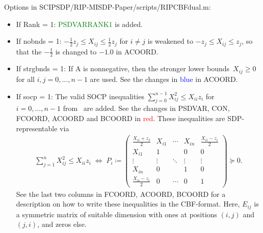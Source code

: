 \documentclass[11pt,a4paper]{article}
\newcommand{\define}{\coloneqq}
\theoremstyle{definition}
\begin{document}
Options in \textsf{SCIPSDP/RIP-MISDP-Paper/scripts/RIPCBFdual.m}:
\begin{itemize}
\item If Rank = 1: \textcolor{green}{PSDVARRANK1} is added.
\item If nobnds = 1: {\color{orange}
    $-\tfrac{1}{2}z_j \leq X_{ij} \leq \tfrac{1}{2}z_j$ for $i \neq j$} is
  weakened to {\color{orange}$-z_j \leq X_{ij} \leq z_j$}, so that the
  {\color{orange} $-\tfrac{1}{2}$} is changed to $-1.0$ in ACOORD.
\item If strgbnds = 1: If A is nonnegative, then the stronger lower
  bounds~$X_{ij} \geq 0$ for all $i,j =0,\dots,n-1$ are used. See the
  changes in \textcolor{blue}{blue} in ACOORD.
\item If socp = 1: The valid SOCP inequalities
  $\sum_{j=0}^{n-1}X_{ij}^2 \leq X_{ii}z_i$ for $i = 0,\dots,n-1$
  from~\cite{LiX20} are added. See the changes in PSDVAR, CON, FCOORD,
  ACOORD and BCOORD in \textcolor{red}{red}. These inequalities are
  SDP-representable via
  \begin{align*}
    \sum_{j=1}^n X_{ij}^2 \leq X_{ii}z_i \; \Leftrightarrow \;
    P_i \define \begin{pmatrix}
      \tfrac{X_{ii}+z_I}{2} & X_{i1} & \cdots & X_{in} & \tfrac{X_{ii}-z_i}{2}
      \\
      X_{i1} & 1 & & 0 & 0 \\
      \vdots &\vdots & \ddots & \vdots & \vdots \\
      X_{in} & 0 & & 1 & 0 \\
      \tfrac{X_{ii}-z_i}{2} & 0 & \cdots & 0 & 1
    \end{pmatrix} \succeq 0.
  \end{align*}
  See the last two columns in FCOORD, ACOORD, BCOORD for a description on
  how to write these inequalities in the CBF-format. Here, $E_{ij}$ is a
  symmetric matrix of suitable dimension with ones at positions $(i,j)$ and
  $(j,i)$, and zeros else.
\end{itemize}

\begin{small}
  
  
\end{small}
\end{document}
